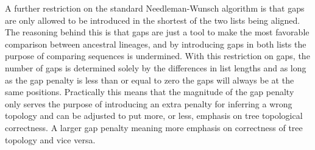 A further restriction on the standard Needleman-Wunsch algorithm is that gaps are only allowed to be introduced in the shortest of the two lists being aligned.
The reasoning behind this is that gaps are just a tool to make the most favorable comparison between ancestral lineages, and by introducing gaps in both lists the purpose of comparing sequences is undermined.
With this restriction on gaps, the number of gaps is determined solely by the differences in list lengths and as long as the gap penalty is less than or equal to zero the gaps will always be at the same positions.
Practically this means that the magnitude of the gap penalty only serves the purpose of introducing an extra penalty for inferring a wrong topology and can be adjusted to put more, or less, emphasis on tree topological correctness.
A larger gap penalty meaning more emphasis on correctness of tree topology and vice versa.

